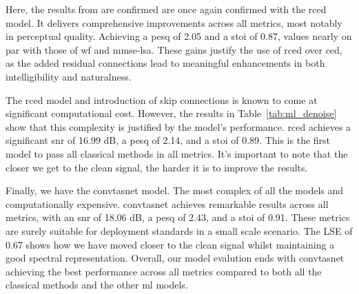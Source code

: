Here, the results from \cite{park2017acoustic} are confirmed are once again confirmed with the \gls{rced} model. It delivers comprehensive improvements across all metrics, most notably in perceptual quality. Achieving a \gls{pesq} of 2.05 and a \gls{stoi} of 0.87, values nearly on par with those of \gls{wf} and \gls{mmse-lsa}. These gains justify the use of \gls{rced} over \gls{ced}, as the added residual connections lead to meaningful enhancements in both intelligibility and naturalness.

The \gls{rced} model and introduction of skip connections is known to come at significant computational cost. However, the results in Table~\ref{tab:ml_denoise} show that this complexity is justified by the model's performance. \gls{rced} achieves a significant \gls{snr} of 16.99 dB, a \gls{pesq} of 2.14, and a \gls{stoi} of 0.89. This is the first model to pass all classical methods in all metrics. It’s important to note that the closer we get to the clean signal, the harder it is to improve the results.

Finally, we have the \gls{convtasnet} model. The most complex of all the models and computationally expensive. \gls{convtasnet} achieves remarkable results across all metrics, with an \gls{snr} of 18.06 dB, a \gls{pesq} of 2.43, and a \gls{stoi} of 0.91. These metrics are surely suitable for deployment standards in a small scale scenario. The LSE of 0.67 shows how we have moved closer to the clean signal whilst maintaining a good spectral representation. Overall, our model evalution ends with \gls{convtasnet} achieving the best performance across all metrics compared to both all the classical methods and the other \gls{ml} models.

